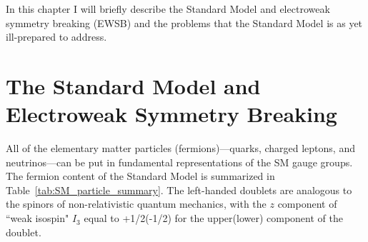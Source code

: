 \documentclass[dissertation.tex]{subfiles}
\begin{document}
In this chapter I will briefly describe the Standard Model and electroweak symmetry breaking (EWSB) and the problems that the Standard Model is as yet ill-prepared to address.

\section{The Standard Model and Electroweak Symmetry Breaking}
\label{sec:The Standard Model and Electroweak Symmetry Breaking}

All of the elementary matter particles (fermions)---quarks, charged leptons, and neutrinos---can be put in fundamental representations of the SM gauge groups.  The fermion content of the Standard Model is summarized in Table~\ref{tab:SM_particle_summary}.  The left-handed doublets are analogous to the spinors of non-relativistic quantum mechanics, with the $z$ component of ``weak isospin" $I_{3}$ equal to +1/2(-1/2) for the upper(lower) component of the doublet.
\end{document}
